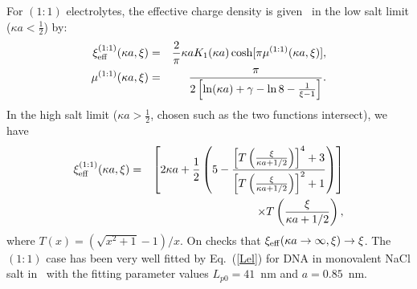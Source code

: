 \documentclass[aps,pre,twocolumn]{revtex4}
\newcommand{\bea}{\begin{eqnarray}}
\newcommand{\eea}{\end{eqnarray}}
\def\eq#1{Eq.~(\ref{#1})}
\begin{document}
For $(1:1)$ electrolytes, the effective charge density is given~\cite{TS} in the low salt limit ($\kappa a<\frac12$) by:
\bea
\xi^{(1:1)}_{\rm eff}(\kappa a,\xi) &=& \frac{2}{\pi}\kappa aK_{1}(\kappa a)\cosh[\pi \mu^{(1:1)}(\kappa a,\xi)],
\label{xieff 1.1<}\\
\mu^{(1:1)}(\kappa a,\xi) &=& \frac{\pi}{2\left[\ln(\kappa a)+\gamma-\ln8-\frac{1}{\xi-1}\right]}.
\label{mu11}
\eea
In the high salt limit ($\kappa a>\frac12$, chosen such as the two functions intersect), we have
\bea
\xi^{(1:1)}_{\rm eff}(\kappa a,\xi)&=&\left[2\kappa a+\frac{1}{2}\left(5-\frac{\left[T\left(\frac{\xi}{\kappa a +1/2}\right)\right]^{4}+3}{\left[T\left(\frac{\xi}{\kappa a +1/2}\right)\right]^{2}+1}\right)\right]\nonumber\\
& & \times T\left(\frac{\xi}{\kappa a +1/2}\right),
\label{xieff 1.1>}
\eea
where $T(x)=(\sqrt{x^{2}+1}-1)/x$. On checks that $\xi_{\rm eff}(\kappa a\to\infty,\xi)\to\xi$.
The $(1:1)$ case has been very well fitted by \eq{Lel} for DNA in monovalent NaCl salt in~\cite{PRL2019} with the fitting parameter values $L_{p0}=41$~nm and $a=0.85$~nm.
\end{document}
